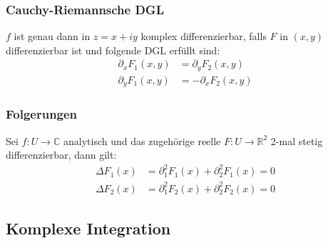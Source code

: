 \documentclass[a4paper,twocolumn,10pt]{article}
\begin{document}
\subsubsection{Cauchy-Riemannsche DGL}
$f$ ist genau dann in $z=x+iy$ komplex differenzierbar, falls $F$ in $(x,y)$ differenzierbar ist und folgende DGL erfüllt sind:
\begin{equation*}
\begin{split}
\partial_x F_1(x,y)&=\partial_y F_2(x,y)\\
\partial_y F_1(x,y)&=-\partial_x F_2(x,y)
\end{split}
\end{equation*}

\subsubsection{Folgerungen}
Sei $f:U\rightarrow\mathbb{C}$ analytisch und das zugehörige reelle $F:U\rightarrow\mathbb{R}^2$ 2-mal stetig differenzierbar, dann gilt:
\begin{equation*}
\begin{split}
\Delta F_1(x)&=\partial_1^2F_1(x)+\partial_2^2 F_1(x)=0\\
\Delta F_2(x)&=\partial_1^2F_2(x)+\partial_2^2 F_2(x)=0
\end{split}
\end{equation*}

\subsection{Komplexe Integration}
\end{document}
